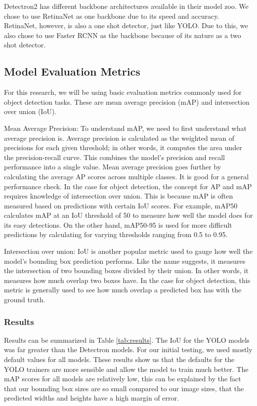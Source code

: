 \documentclass[stu,12pt,floatsintext]{apa7}
\begin{document}
Detectron2 has different backbone architectures available in their model zoo. We chose to use RetinaNet as one backbone due to its speed and accuracy. RetinaNet, however, is also a one shot detector, just like YOLO. Due to this, we also chose to use Faster RCNN as the backbone because of its nature as a two shot detector.

\subsection{Model Evaluation Metrics}
For this research, we will be using basic evaluation metrics commonly used for object detection tasks. These are mean average precision (mAP) and intersection over union (IoU).

Mean Average Precision: To understand mAP, we need to first understand what average precision is. Average precision is calculated as the weighted mean of precisions for each given threshold; in other words, it computes the area under the precision-recall curve. This combines the model's precision and recall performance into a single value. Mean average precision goes further by calculating the average AP scores across multiple classes. It is good for a general performance check. In the case for object detection, the concept for AP and mAP requires knowledge of intersection over union. This is because mAP is often measured based on predictions with certain IoU scores. For example, mAP50 calculates mAP at an IoU threshold of 50 to measure how well the model does for its easy detections. On the other hand, mAP50-95 is used for more difficult predictions by calculating for varying thresholds ranging from 0.5 to 0.95.

Intersection over union: IoU is another popular metric used to gauge how well the model's bounding box prediction performs. Like the name suggests, it measures the intersection of two bounding boxes divided by their union. In other words, it measures how much overlap two boxes have. In the case for object detection, this metric is generally used to see how much overlap a predicted box has with the ground truth.

\subsubsection{Results}
Results can be summarized in Table \ref{tab:results}. The IoU for the YOLO models was far greater than the Detectron models. For our initial testing, we used mostly default values for all models. These results show us that the defaults for the YOLO trainers are more sensible and allow the model to train much better. The mAP scores for all models are relatively low, this can be explained by the fact that our bounding box sizes are so small compared to our image sizes, that the predicted widths and heights have a high margin of error.
\end{document}
